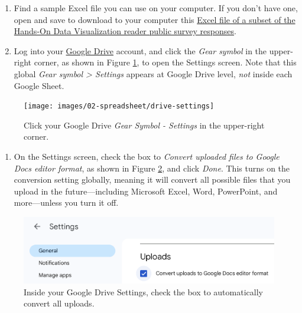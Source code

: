 \documentclass[
  english,
]{book}
\providecommand{\tightlist}{%
  \setlength{\itemsep}{0pt}\setlength{\parskip}{0pt}}
\begin{document}
\begin{enumerate}
\def\labelenumi{\arabic{enumi}.}
\item
  Find a sample Excel file you can use on your computer. If you don't have one, open and save to download to your computer this \href{data/subset-reader-survey.xlsx}{Excel file of a subset of the Hands-On Data Visualization reader public survey responses}.
\item
  Log into your \href{https://drive.google.com}{Google Drive} account, and click the \emph{Gear symbol} in the upper-right corner, as shown in Figure \ref{fig:drive-settings}, to open the Settings screen. Note that this global \emph{Gear symbol \textgreater{} Settings} appears at Google Drive level, \emph{not} inside each Google Sheet.
\end{enumerate}



\begin{figure}
\texttt{[image: images/02-spreadsheet/drive-settings]} \caption{Click your Google Drive \emph{Gear Symbol - Settings} in the upper-right corner.}\label{fig:drive-settings}
\end{figure}

\begin{enumerate}
\def\labelenumi{\arabic{enumi}.}
\setcounter{enumi}{2}
\tightlist
\item
  On the Settings screen, check the box to \emph{Convert uploaded files to Google Docs editor format}, as shown in Figure \ref{fig:convert-uploads}, and click \emph{Done}. This turns on the conversion setting globally, meaning it will convert all possible files that you upload in the future---including Microsoft Excel, Word, PowerPoint, and more---unless you turn it off.
\end{enumerate}



\begin{figure}
\includegraphics[width=750px]{images/02-spreadsheet/convert-uploads} \caption{Inside your Google Drive Settings, check the box to automatically convert all uploads.}\label{fig:convert-uploads}
\end{figure}
\end{document}
